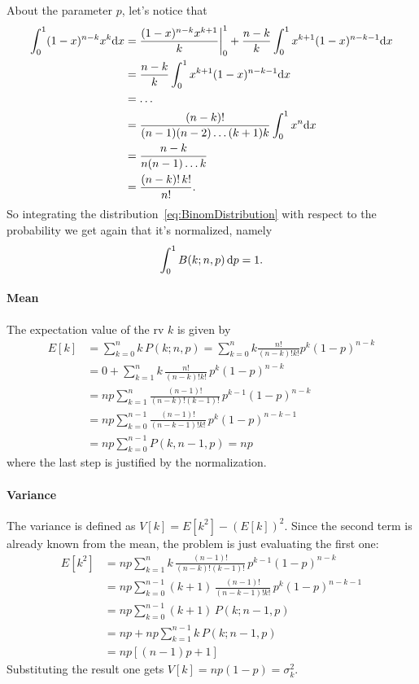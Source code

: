 \documentclass[
	10pt,
	draft
]{scrreprt}
\begin{document}
About the parameter $p$, let's notice that
\begin{equation*}
\begin{aligned}
\int_0^1 (1-x)^{n-k}x^k\!\ud x 
&= \frac{(1-x)^{n-k} x^{k+1}}{k}\bigg\rvert_0^1 +\frac{n-k}{k}\int_0^1 x^{k+1}(1-x)^{n-k-1}\!\ud x\\
&=\frac{n-k}{k}\int_0^1 x^{k+1}(1-x)^{n-k-1}\!\ud x\\
&=\dots\\
&= \frac{(n-k)!}{(n-1)(n-2)\dots(k+1)k}\int_0^1 x^n\!\ud x\\
&=\frac{n-k}{n(n-1)\dots k} \\
&= \frac{(n-k)!\,k!}{n!}.
\end{aligned}
\end{equation*}
So integrating the distribution~\eqref{eq:BinomDistribution} with respect to the probability we get again that it's normalized, namely
\begin{equation}
\int_0^1B(k;n,p)\mathop{}\!\mathrm{d} p = 1.
\end{equation}


\paragraph{Mean} The expectation value of the \ac{rv} $k$ is given by
\begin{equation}
\begin{aligned}
E[k] &= \sum_{k=0}^n k\,P(k;n,p) = \sum_{k=0}^n k \frac{n!}{(n-k)!k!}p^k(1-p)^{n-k} \\
&= 0 + \sum_{k=1}^n k \,\frac{n!}{(n-k)!k!}\,p^k(1-p)^{n-k} \\
&= np\sum_{k=1}^n \frac{(n-1)!}{(n-k)!(k-1)!}\,p^{k-1}(1-p)^{n-k} \\
&= np\sum_{k=0}^{n-1} \frac{(n-1)!}{(n-k - 1)!k!}\,p^{k}(1-p)^{n-k - 1} \\
&= np\sum_{k=0}^{n-1} P(k, n-1,p) = np
\end{aligned}
\end{equation}
where the last step is justified by the normalization.

\paragraph{Variance}
The variance is defined as $V[k] = E[k^2] - (E[k])^2$.
Since the second term is already known from the mean, the problem is just evaluating the first one:
\begin{equation}
\begin{aligned}
E[k^2] &= np\sum_{k=1}^n k \,\frac{(n-1)!}{(n-k)! (k-1)!}\,p^{k-1}(1-p) ^{n - k}\\
&= np\sum_{k=0}^{n-1} (k + 1) \,\frac{(n-1)!}{(n-k - 1)! k!}\,p^{k}(1-p) ^{n - k-1}\\
&= np\sum_{k=0}^{n-1} (k + 1) \,P(k;n-1,p)\\
&= np  + np \sum_{k=1}^{n-1} k\, P(k;n-1,p)\\
&=np[( n - 1 )p + 1 ]
\end{aligned}
\end{equation}
Substituting the result one gets $V[k] = np(1-p) = \sigma_k^2$.
\end{document}

